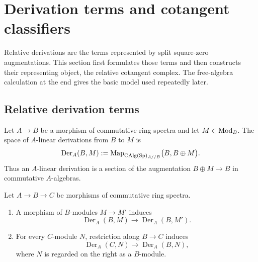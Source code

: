 \section{Derivation terms and cotangent classifiers}
\label{sec:derivation-cotangent}

Relative derivations are the terms represented by split square-zero
augmentations. This section first formulates those terms and then constructs
their representing object, the relative cotangent complex. The free-algebra
calculation at the end gives the basic model used repeatedly later.

\subsection{Relative derivation terms}

\begin{definition}
\label{def:spectral-derivation}
Let \(A\to B\) be a morphism of commutative ring spectra and let
\(M\in\operatorname{Mod}_B\). The space of \(A\)-linear derivations from \(B\) to \(M\) is
\[
    \operatorname{Der}_A(B,M)
    :=
    \operatorname{Map}_{\operatorname{CAlg}(\operatorname{Sp})_{A//B}}
    \bigl(B,B\oplus M\bigr).
\]
Thus an \(A\)-linear derivation is a section of the augmentation
\(B\oplus M\to B\) in commutative \(A\)-algebras.
\end{definition}

\begin{proposition}
\label{prop:derivation-elementary-functoriality}
Let \(A\to B\to C\) be morphisms of commutative ring spectra.
\begin{enumerate}[label=(\roman*)]
    \item A morphism of \(B\)-modules \(M\to M'\) induces
    \[
        \operatorname{Der}_A(B,M)
        \longrightarrow
        \operatorname{Der}_A(B,M').
    \]
    \item For every \(C\)-module \(N\), restriction along \(B\to C\) induces
    \[
        \operatorname{Der}_A(C,N)
        \longrightarrow
        \operatorname{Der}_A(B,N),
    \]
    where \(N\) is regarded on the right as a \(B\)-module.
\end{enumerate}
\end{proposition}

